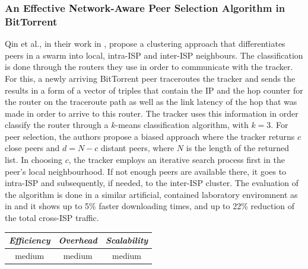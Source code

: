 \subsubsection{An Effective Network-Aware Peer Selection Algorithm in
BitTorrent}
Qin et al., in their work in \cite{QLZG2009}, propose a
clustering approach that differentiates peers in a swarm into local, intra-ISP
and inter-ISP neighbours. The classification is done through the routers they
use in order to communicate with the tracker. For this, a newly arriving
BitTorrent peer traceroutes the tracker and sends the results in a form of a
vector of triples that contain the IP and the hop counter for the router on the
traceroute path as well as the link latency of the hop that was made in order to
arrive to this router. The tracker uses this information in order classify the
router through a $k$-means classification algorithm, with $k = 3$. For peer
selection, the authors propose a biased approach where the tracker returns $c$
close peers and $d = N - c$ distant peers, where $N$ is the length of the
returned list. In choosing $c$, the tracker employs an iterative search process
first in the peer's local neighbourhood. If not enough peers are available
there, it goes to intra-ISP and subsequently, if needed, to the inter-ISP
cluster. The evaluation of the algorithm is done in a similar artificial,
contained laboratory enviromnent as in \cite{LCY2008} and it shows up to
5\% faster downloading times, and up to 22\% reduction of the total cross-ISP
traffic.

\begin{center}
\begin{tabular}{ccc}
\emph{Efficiency} & \emph{Overhead} & \emph{Scalability} \\
\hline
medium &
medium &
medium
\end{tabular}
\end{center}

